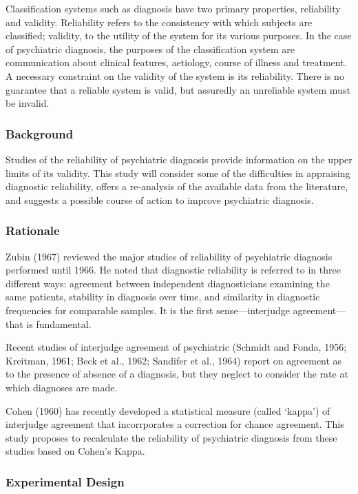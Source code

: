 \begin{refsection}
Classification systems such as diagnosis have two primary properties, reliability and validity. Reliability refers to the consistency with which subjects are classified; validity, to the utility of the system for its various purposes. In the case of psychiatric diagnosis, the purposes of the classification system are communication about clinical features, aetiology, course of illness and treatment. A necessary constraint on the validity of the system is its reliability. There is no guarantee that a reliable system is valid, but assuredly an unreliable system must be invalid.

\subsubsection{Background}
\label{background}

Studies of the reliability of psychiatric diagnosis provide information on the upper limits of its validity. This study will consider some of the difficulties in appraising diagnostic reliability, offers a re-analysis of the available data from the literature, and suggests a possible course of action to improve psychiatric diagnosis.

\subsubsection{Rationale}
\label{rationale}

Zubin (1967) reviewed the major studies of reliability of psychiatric diagnosis performed until 1966. He noted that diagnostic reliability is referred to in three different ways: agreement between independent diagnosticians examining the same patients, stability in diagnosis over time, and similarity in diagnostic frequencies for comparable samples. It is the first sense—interjudge agreement—that is fundamental.

Recent studies of interjudge agreement of psychiatric (Schmidt and Fonda, 1956; Kreitman, 1961; Beck et al., 1962; Sandifer et al., 1964) report on agreement as to the presence of absence of a diagnosis, but they neglect to consider the rate at which diagnoses are made.

Cohen (1960) has recently developed a statistical measure (called `kappa') of interjudge agreement that incorrporates a correction for chance agreement. This study proposes to recalculate the reliability of psychiatric diagnosis from these studies based on Cohen's Kappa.

\subsubsection{Experimental Design}
\label{experimentaldesign}


\end{refsection}
